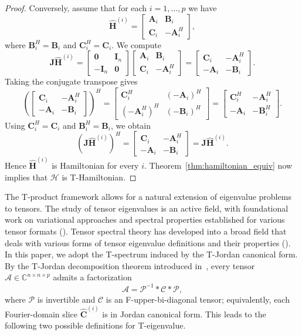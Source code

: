 \documentclass[pdflatex,sn-mathphys-ay]{sn-jnl}
\newcommand{\T}[1]{\mathcal{#1}}    %
\newcommand{\M}[1]{\bm{#1}}     %
\newcommand{\C}{\mathbb{C}}         %
\theoremstyle{thmstyleone}
\theoremstyle{thmstyletwo}
\theoremstyle{thmstylethree}
\numberwithin{equation}{section}
\begin{document}
\begin{proof}
Conversely, assume that for each $i=1,\dots,p$ we have
$$
\widehat{\M{H}}^{(i)} =
\begin{bmatrix}
\M{A}_i & \M{B}_i \\
\M{C}_i & -\M{A}_i^H
\end{bmatrix},
$$
where $\M{B}_i^H = \M{B}_i$ and $\M{C}_i^H = \M{C}_i$. We compute
$$
\M{J}\widehat{\M{H}}^{(i)}
=
\begin{bmatrix}
\M{0} & \M{I}_n \\
-\M{I}_n & \M{0}
\end{bmatrix}
\begin{bmatrix}
\M{A}_i & \M{B}_i \\
\M{C}_i & -\M{A}_i^H
\end{bmatrix}
=
\begin{bmatrix}
\M{C}_i & -\M{A}_i^H \\
-\M{A}_i & -\M{B}_i
\end{bmatrix}.
$$
Taking the conjugate transpose gives
$$
\left(
\begin{bmatrix}
\M{C}_i & -\M{A}_i^H \\
-\M{A}_i & -\M{B}_i
\end{bmatrix}
\right)^H
=
\begin{bmatrix}
\M{C}_i^H & (-\M{A}_i)^H \\
(-\M{A}_i^H)^H & (-\M{B}_i)^H
\end{bmatrix}
=
\begin{bmatrix}
\M{C}_i^H & -\M{A}_i^H \\
-\M{A}_i & -\M{B}_i^H
\end{bmatrix}.
$$
Using $\M{C}_i^H = \M{C}_i$ and $\M{B}_i^H = \M{B}_i$, we obtain
$$
(\M{J}\widehat{\M{H}}^{(i)})^H
=
\begin{bmatrix}
\M{C}_i & -\M{A}_i^H \\
-\M{A}_i & -\M{B}_i
\end{bmatrix}
=
\M{J}\widehat{\M{H}}^{(i)}.
$$
Hence $\widehat{\M{H}}^{(i)}$ is Hamiltonian for every $i$. Theorem~\ref{thm:hamiltonian_equiv} now implies that $\T{H}$ is T-Hamiltonian.
\end{proof}

The T-product framework allows for a natural extension of eigenvalue problems to tensors.
The study of tensor eigenvalues is an active field, with foundational work on variational approaches and spectral properties established for various tensor formats (\cite{qi2005eigenvalues, lim2005singular}). 
Tensor spectral theory has developed into a broad field that deals with various forms of tensor eigenvalue definitions and their properties (\cite{qi2017tensor}).
In this paper, we adopt the T-spectrum induced by the T-Jordan canonical form. By the T-Jordan decomposition theorem introduced in~\cite{miao2021t}, every tensor $\T{A} \in \C^{n \times n \times p}$ admits a factorization
\begin{equation*}
\T{A} = \T{P}^{-1} * \T{C} * \T{P},
\end{equation*}
where $\T{P}$ is invertible and $\T{C}$ is an F-upper-bi-diagonal tensor; equivalently, each Fourier-domain slice $\widehat{\M{C}}^{(i)}$ is in Jordan canonical form. This leads to the following two possible definitions for T-eigenvalue.
\end{document}
